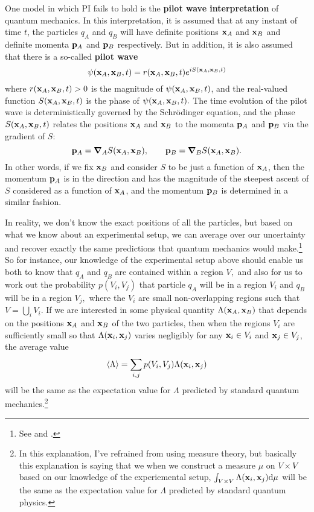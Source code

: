 One model in which PI fails to hold is the \textbf{pilot wave interpretation} of quantum mechanics. In this interpretation, it is assumed that at any instant of time $t$, the particles $q_A$ and $q_B$ will have definite positions $\vb{x}_A$ and $\vb{x}_B$ and definite momenta $\vb{p}_A$ and $\vb{p}_B$ respectively. But in addition, it is also assumed that there is a so-called \textbf{pilot wave} 
\begin{equation}
\psi(\vb{x}_A, \vb{x}_B, t)=r(\vb{x}_A, \vb{x}_B, t)e^{i S(\vb{x}_A, \vb{x}_B, t)} 
\end{equation}
where $r(\vb{x}_A, \vb{x}_B, t)>0$ is the magnitude of $\psi(\vb{x}_A, \vb{x}_B, t)$, and the real-valued function $S(\vb{x}_A, \vb{x}_B,t )$ is the phase of $\psi(\vb{x}_A, \vb{x}_B, t).$
The time evolution of the pilot wave is deterministically governed by the Schr\"{o}dinger equation, and the phase $S(\vb{x}_A, \vb{x}_B, t )$ relates the positions $\vb{x}_A$ and $\vb{x}_B$ to the momenta $\vb{p}_A$ and $\vb{p}_B$ via the gradient of $S$:
\begin{equation}
\vb{p}_A=\grad_A{S}(\vb{x}_A, \vb{x}_B),\qquad
\vb{p}_B=\grad_B{S}(\vb{x}_A, \vb{x}_B).
\end{equation}
In other words, if we fix $\vb{x}_B$ and consider $S$ to be just a function of $\vb{x}_A$, then the momentum $\vb{p}_A$ is in the direction and has the magnitude of the steepest ascent of $S$ considered as a function of $\vb{x}_A$, and the momentum $\vb{p}_B$ is determined in a similar fashion. 

In reality, we don't know the exact positions of all the particles, but based on what we know about an experimental setup, we can average over our uncertainty and recover exactly the same predictions that quantum mechanics would make.\footnote{See \cite{BohmDavid1952A} and \cite{BohmDavid1952B}.} So for instance, our knowledge of the experimental setup above should enable us both to know that $q_A$ and $q_B$ are contained within a region $V,$ and also for us to work out the probability  $p(V_i, V_j)$ that particle $q_A$  will be in a region $V_i$ and $q_B$ will be in a region $V_j,$ where the $V_i$ are small non-overlapping regions such that $V=\bigcup_iV_i$. If we are interested in some physical quantity $\Lambda(\vb{x}_A, \vb{x}_B)$ that depends on the positions $\vb{x}_A$ and $\vb{x}_B$ of the two particles, then when the regions $V_i$ are  sufficiently small so that $\Lambda(\vb{x}_i, \vb{x}_j)$ varies negligibly for any $\vb{x}_i\in V_i$ and $\vb{x}_j\in V_j$,  the average value
\begin{equation}\label{bohmconsistency}
\ev{\Lambda}=\sum_{i,j}p(V_i, V_j)\Lambda(\vb{x}_i, \vb{x}_j)
\end{equation}
will be the same as the expectation value for $\Lambda$ predicted by standard quantum mechanics.\footnote{In this explanation, I've refrained from using measure theory, but basically this explanation is saying that we when we construct a measure $\mu$ on $V\times V$ based on our knowledge of the experiemental setup,  $\int_{V\times V}\Lambda(\vb{x}_i, \vb{x}_j)\dd\mu$ will be the same as the expectation value for $\Lambda$ predicted by standard quantum physics. }

